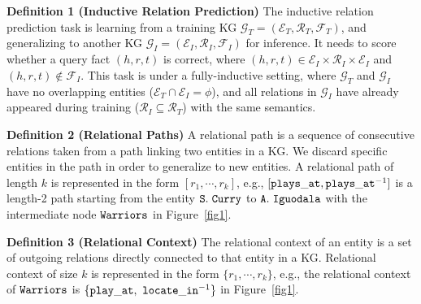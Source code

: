 \documentclass{article}
\begin{document}
\textbf{Definition 1 (Inductive Relation Prediction)}
The inductive relation prediction task is learning from a training KG $\mathcal{G}_{T}=(\mathcal{E}_T,\mathcal{R}_T,\mathcal{F}_T)$, and generalizing to another KG $\mathcal{G}_{I}=(\mathcal{E}_I,\mathcal{R}_I,\mathcal{F}_I)$ for inference.
It needs to score whether a query fact $(h,r,t)$ is correct, where $(h,r,t)\in  \mathcal{E}_I\times \mathcal{R}_I\times \mathcal{E}_I$ and $(h,r,t)\notin \mathcal{F}_{I}$. 
This task is under a fully-inductive setting, where $\mathcal{G}_{T}$ and $\mathcal{G}_{I}$ have no overlapping entities ($\mathcal{E}_T\cap \mathcal{E}_I=\phi$), and all relations in $\mathcal{G}_{I}$ have already appeared during training ($\mathcal{R}_I \subseteq \mathcal{R}_T$) with the same semantics.

\textbf{Definition 2 (Relational Paths)}
A relational path is a sequence of consecutive relations taken from a path linking two entities in a KG.
We discard specific entities in the path in order to generalize to new entities. 
A relational path of length $k$ is represented in the form $[r_1,\cdots,r_k]$, e.g., $[{\small\tt plays\_at}, {\small\tt plays\_at}^{-1}]$ is a length-2 path starting from the entity ${\small\tt S.\ Curry}$ to ${\small\tt A.\ Iguodala}$ with the intermediate node ${\small\tt Warriors}$ in Figure~\ref{fig1}.

\textbf{Definition 3 (Relational Context)}
The relational context of an entity is a set of outgoing relations directly connected to that entity in a KG. Relational context of size $k$ is represented in the form $\{r_1,\cdots,r_k\}$, e.g., the relational context of ${\small\tt Warriors}$ is $\{{\small\tt play\_at},\ {\small\tt locate\_in}^{-1}\}$ in Figure~\ref{fig1}.
\end{document}
